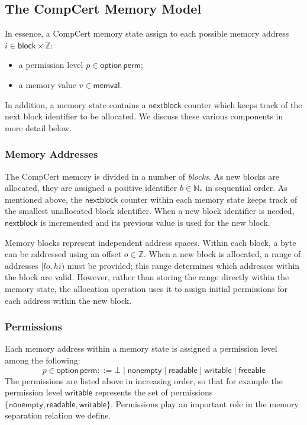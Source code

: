 \documentclass[acmsmall,screen,review,anonymous]{acmart}
\newcommand{\kw}[1]{\ensuremath{ \mathsf{#1} }}
\begin{document}
\subsection{The CompCert Memory Model}

In essence,
a CompCert memory state
assign to each possible memory address $i \in \kw{block} \times \mathbb{Z}$:
\begin{itemize}
  \item a permission level $p \in \kw{option}\,\kw{perm}$;
  \item a memory value $v \in \kw{memval}$.
\end{itemize}
In addition,
a memory state contains a $\kw{nextblock}$ counter
which keeps track of the next block identifier to be allocated.
We discuss these various components in more detail below.

\subsubsection{Memory Addresses}

The CompCert memory is divided in a number of \emph{blocks}.
As new blocks are allocated,
they are assigned a positive identifier $b \in \mathbb{N}_*$
in sequential order.
As mentioned above,
the $\kw{nextblock}$ counter within each memory state
keeps track of the smallest unallocated block identifier.
When a new block identifier is needed,
$\kw{nextblock}$ is incremented and its previous value
is used for the new block.

Memory blocks represent independent address spaces.
Within each block,
a byte can be addressed using an offset $o \in \mathbb{Z}$.
When a new block is allocated,
a range of addresses $[\mathit{lo}, \mathit{hi})$ must be provided;
this range determines which addresses within the block are valid.
However,
rather than storing the range directly within the memory state,
the allocation operation uses it to assign initial permissions
for each address within the new block.

\subsubsection{Permissions}

Each memory address within a memory state
is assigned a permission level among the following:
\[
  p \in \kw{option}\,\kw{perm} ::=
    \bot \mid
    \kw{nonempty} \mid
    \kw{readable} \mid
    \kw{writable} \mid
    \kw{freeable}
\]
The permissions are listed above in increasing order,
so that for example the permission level $\kw{writable}$ 
represents the set of permissions
$\{ \kw{nonempty}, \kw{readable}, \kw{writable} \}$.
Permissions play an important role
in the memory separation relation we define.
\end{document}
